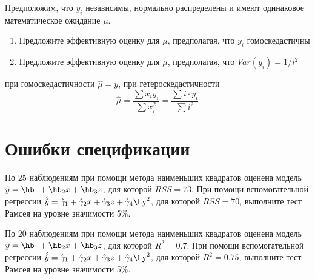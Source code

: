\documentclass[pdftex,11pt,openany]{book}\usepackage[]{graphicx}\usepackage[]{color}
\begin{document}
\begin{solution}

\end{solution}


\begin{problem}
Предположим, что $y_i$ независимы, нормально распределены и имеют одинаковое математическое ожидание $\mu$.

\begin{enumerate}
\item  Предложите эффективную оценку для $\mu$, предполагая, что $y_i$ гомоскедастичны
\item  Предложите эффективную оценку для $\mu$, предполагая, что $Var(y_i)=1/i^2$
\end{enumerate}
\end{problem}

\begin{solution}
при гомоскедастичности $\hat{\mu}=\bar{y}$, при гетероскедастичности
\[
\hat{\mu}=\frac{\sum x_i y_i}{\sum x_i^2}=\frac{\sum i\cdot y_i}{\sum i^2}
\]
\end{solution}


\chapter{Ошибки спецификации}


\begin{problem}
По $25$ наблюдениям при помощи метода наименьших квадратов оценена
модель $\hat{y}=\hb_1+\hb_2 x +\hb_3 z$, для которой $RSS = 73$. При помощи вспомогательной регрессии $\hat{\hat{y}}=\hat{\gamma}_1+\hat{\gamma}_2 x +\hat{\gamma}_3 z+\hat{\gamma}_4 \hy^2$, для которой $RSS = 70$, выполните тест Рамсея на уровне значимости 5\%. 
\end{problem}

\begin{solution}
\end{solution}


\begin{problem}
По $20$ наблюдениям при помощи метода наименьших квадратов оценена
модель $\hat{y}=\hb_1+\hb_2 x +\hb_3 z$, для которой $R^2 = 0.7$. При помощи вспомогательной регрессии $\hat{\hat{y}}=\hat{\gamma}_1+\hat{\gamma}_2 x +\hat{\gamma}_3 z+\hat{\gamma}_4 \hy^2$, для которой $R^2 = 0.75$, выполните тест Рамсея на уровне значимости 5\%. 
\end{problem}

\begin{solution}
\end{solution}
\end{document}
